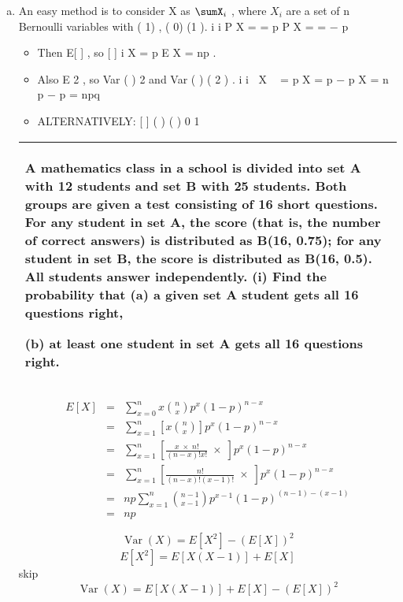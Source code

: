 \documentclass[a4paper,12pt]{article}
\begin{document}
\begin{enumerate}[(a)]
\item An easy method is to consider X as $\sumX_i$ , where $X_i$ are a set of n Bernoulli variables
with ( 1) , ( 0) (1 ). i i P X = = p P X = = − p
\begin{itemize}
\item Then E[ ] , so [ ] i X = p E X = np .
\item Also E 2 , so Var ( ) 2 and Var ( ) ( 2 ) . i i X  = p X = p − p X = n p − p = npq
\item ALTERNATIVELY: [ ] ( ) ( ) 0 1

\end{itemize}

\begin{table}[ht!]
\centering
\begin{tabular}{|p{15cm}|}
\hline
\noindent 
A mathematics class in a school is divided into set A with 12 students and set B with 25 students. Both groups are given a test consisting of 16 short questions.
For any student in set A, the score (that is, the number of correct answers) is distributed as B(16, 0.75); for any student in set B, the score is distributed as
B(16, 0.5). All students answer independently.
(i) Find the probability that
(a) a given set A student gets all 16 questions right,

(b) at least one student in set A gets all 16 questions right.

\\ \hline
\end{tabular}
\end{table}
\begin{eqnarray*}
E[X] 
&=& \sum^{n}_{x=0} x {n \choose x} p^x (1-p)^{n-x} \\
&=& \sum^{n}_{x=1} \left[ x {n \choose x} \right] p^x (1-p)^{n-x} \\
&=& \sum^{n}_{x=1} \left[  \frac{x \;\times\; n!}{(n-x)! x!} \;\times\; \right] p^x (1-p)^{n-x} \\
&=& \sum^{n}_{x=1} \left[  \frac{ n!}{(n-x)! (x-1)!} \;\times\; \right] p^x (1-p)^{n-x} \\
&=& np \sum^{n}_{x=1}  {n-1 \choose x-1} p^{x-1} (1-p)^{(n-1)-(x-1)} \\
&=& np
\end{eqnarray*}



\begin{framed}
\[\operatorname{Var}(X) = E[X^2] - (E[X])^2\] \smallskip
\[E[X^2] = E[X(X-1)] + E[X]\] \small skip
\[\operatorname{Var}(X) = E[X(X-1)] + E[X] - (E[X])^2\]
\end{framed}



\end{enumerate}
\end{document}
